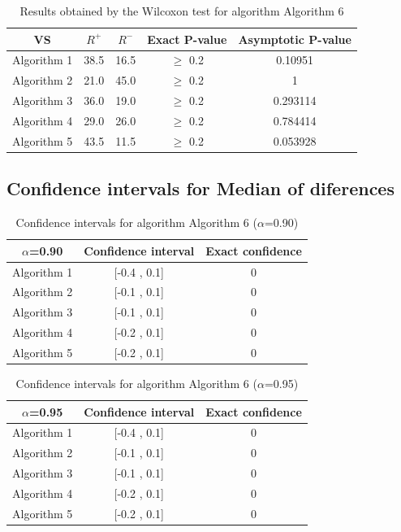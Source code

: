 \documentclass[a4paper,10pt]{article}
\begin{document}
\begin{table}[!htp]
\centering\small
\begin{tabular}{
|c|c|c|c|c|}
\hline
 VS & $R^{+}$ & $R^{-}$ & Exact P-value & Asymptotic P-value \\ \hline 
Algorithm 1 & 38.5 & 16.5 & $\geq$ 0.2 & 0.10951\\ \hline 
Algorithm 2 & 21.0 & 45.0 & $\geq$ 0.2 & 1\\ \hline 
Algorithm 3 & 36.0 & 19.0 & $\geq$ 0.2 & 0.293114\\ \hline 
Algorithm 4 & 29.0 & 26.0 & $\geq$ 0.2 & 0.784414\\ \hline 
Algorithm 5 & 43.5 & 11.5 & $\geq$ 0.2 & 0.053928\\ \hline 

\end{tabular}
\caption{Results obtained by the Wilcoxon test for algorithm Algorithm 6}
\end{table}

\subsection{Confidence intervals for Median of diferences}

\begin{table}[!htp]
\centering\small
\begin{tabular}{
|c|c|c|}
\hline
 $\alpha$=0.90 & Confidence interval & Exact confidence \\ \hline 
Algorithm 1 & [-0.4 , 0.1] & 0\\ \hline 
Algorithm 2 & [-0.1 , 0.1] & 0\\ \hline 
Algorithm 3 & [-0.1 , 0.1] & 0\\ \hline 
Algorithm 4 & [-0.2 , 0.1] & 0\\ \hline 
Algorithm 5 & [-0.2 , 0.1] & 0\\ \hline 

\end{tabular}
\caption{Confidence intervals for algorithm Algorithm 6 ($\alpha$=0.90)}
\end{table}
\begin{table}[!htp]
\centering\small
\begin{tabular}{
|c|c|c|}
\hline
 $\alpha$=0.95 & Confidence interval & Exact confidence \\ \hline 
Algorithm 1 & [-0.4 , 0.1] & 0\\ \hline 
Algorithm 2 & [-0.1 , 0.1] & 0\\ \hline 
Algorithm 3 & [-0.1 , 0.1] & 0\\ \hline 
Algorithm 4 & [-0.2 , 0.1] & 0\\ \hline 
Algorithm 5 & [-0.2 , 0.1] & 0\\ \hline 

\end{tabular}
\caption{Confidence intervals for algorithm Algorithm 6 ($\alpha$=0.95)}
\end{table}

 \clearpage 
\end{document}
